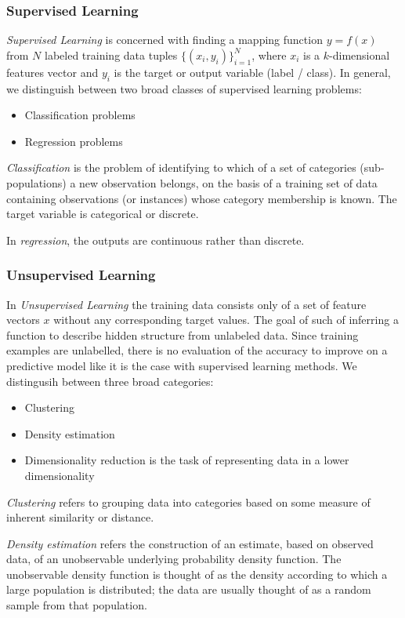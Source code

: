 \documentclass[11pt]{article}
\theoremstyle{plain}
\theoremstyle{definition}
\begin{document}
\subsubsection{Supervised Learning}
\textit{Supervised Learning} is concerned with finding a mapping function $y=f(x)$ from $N$ labeled training data tuples $\{ (x_i, y_i)\}_{i=1}^N$, where $x_i$ is a $k$-dimensional features vector and $y_i$ is the target or output variable (label / class). In general, we distinguish between two broad classes of supervised learning problems:
\begin{itemize}
	\item Classification problems
	\item Regression problems
\end{itemize}
\textit{Classification} is the problem of identifying to which of a set of categories (sub-populations) a new observation belongs, on the basis of a training set of data containing observations (or instances) whose category membership is known. The target variable is categorical or discrete.

In \textit{regression}, the outputs are continuous rather than discrete.

\subsubsection{Unsupervised Learning}
In \textit{Unsupervised Learning} the training data consists only of a set of feature vectors $x$ without any corresponding target values. The goal of such of inferring a function to describe hidden structure from unlabeled data. Since training examples are unlabelled, there is no evaluation of the accuracy to improve on a predictive model like it is the case with supervised learning methods. We distingusih between three broad categories:
\begin{itemize}
	\item Clustering
	\item Density estimation
	\item Dimensionality reduction is the task of representing data in a lower dimensionality
\end{itemize}

\textit{Clustering} refers to grouping data into categories based on some measure of inherent similarity or distance.

\textit{Density estimation} refers the construction of an estimate, based on observed data, of an unobservable underlying probability density function. The unobservable density function is thought of as the density according to which a large population is distributed; the data are usually thought of as a random sample from that population.
\end{document}
